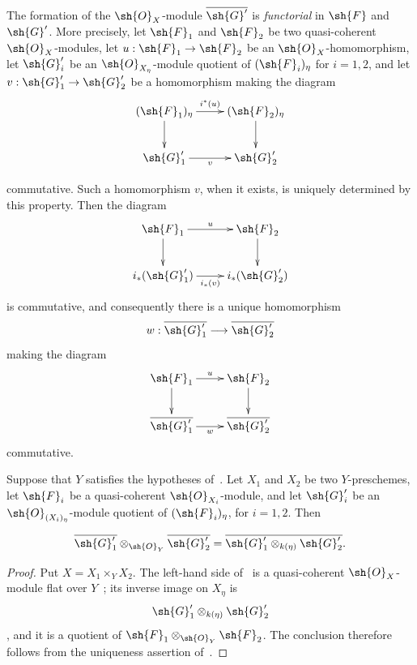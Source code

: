 \begin{env}[2.8.3]
\label{IV.2.8.3}
The formation of the $\sh{O}_X$-module $\overline{\sh{G}'}$ is
\emph{functorial} in $\sh{F}$ and $\sh{G}'$. More precisely, let
$\sh{F}_1$ and $\sh{F}_2$ be two quasi-coherent
$\sh{O}_X$-modules, let
$u:\sh{F}_1\to\sh{F}_2$ be an $\sh{O}_X$-homomorphism, let
$\sh{G}'_i$ be an $\sh{O}_{X_\eta}$-module quotient of
$(\sh{F}_i)_\eta$ for $i=1,2$, and let
$v:\sh{G}'_1\to\sh{G}'_2$ be a homomorphism making the diagram
\[
\xymatrix{
  (\sh{F}_1)_\eta \ar[r]^{i^*(u)} \ar[d]
    &(\sh{F}_2)_\eta \ar[d] \\
  \sh{G}'_1 \ar[r]_v
    &\sh{G}'_2
}
\]


commutative. Such a homomorphism $v$, when it exists, is uniquely
determined by this property. Then the diagram
\[
\xymatrix{
  \sh{F}_1 \ar[r]^u \ar[d]
    &\sh{F}_2 \ar[d] \\
  i_*(\sh{G}'_1) \ar[r]_{i_*(v)}
    &i_*(\sh{G}'_2)
}
\]
is commutative, and consequently there is a unique homomorphism
\[
  w:\overline{\sh{G}'_1}\longrightarrow\overline{\sh{G}'_2}
\]
making the diagram
\[
\xymatrix{
  \sh{F}_1 \ar[r]^u \ar[d]
    &\sh{F}_2 \ar[d] \\
  \overline{\sh{G}'_1} \ar[r]_w
    &\overline{\sh{G}'_2}
}
\]
commutative.
\end{env}

\begin{proposition}[2.8.4]
\label{IV.2.8.4}
Suppose that $Y$ satisfies the hypotheses of~. Let
$X_1$ and $X_2$ be two $Y$-preschemes, let $\sh{F}_i$ be a
quasi-coherent $\sh{O}_{X_i}$-module, and let $\sh{G}'_i$ be an
$\sh{O}_{(X_i)_\eta}$-module quotient of $(\sh{F}_i)_\eta$, for
$i=1,2$. Then
\end{proposition}

\begin{env}[2.8.4.1]
\label{IV.2.8.4.1}
\[
  \overline{\sh{G}'_1}\otimes_{\sh{O}_Y}\overline{\sh{G}'_2}
    =
  \overline{\sh{G}'_1\otimes_{k(\eta)}\sh{G}'_2}.
\]
\end{env}

\begin{proof}
Put $X=X_1\times_Y X_2$. The left-hand side
of~ is a quasi-coherent $\sh{O}_X$-module flat over
$Y$~; its inverse image on $X_\eta$ is
\[
  \sh{G}'_1\otimes_{k(\eta)}\sh{G}'_2
\]
, and it is a quotient of
$\sh{F}_1\otimes_{\sh{O}_Y}\sh{F}_2$. The conclusion therefore
follows from the uniqueness assertion of~.
\end{proof}

